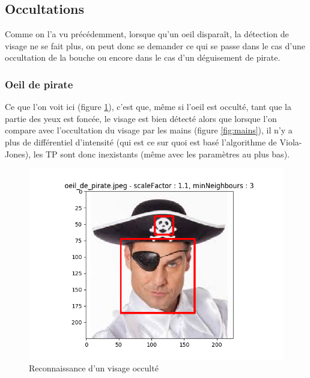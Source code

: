 \documentclass[a4paper,11pt]{article}
\begin{document}
    \subsection{Occultations}
	
	Comme on l'a vu précédemment, lorsque qu'un oeil disparaît, la détection de visage ne se
	fait plus, on peut donc se demander ce qui se passe dans le cas d'une occultation de la
	bouche ou encore dans le cas d'un déguisement de pirate.

	\subsubsection{Oeil de pirate}

	    Ce que l'on voit ici (figure \ref{fig:pirate}), c'est que, même si l'oeil est occulté, tant
	    que la partie des yeux est foncée, le visage est bien détecté alors que lorsque l'on
	    compare avec l'occultation du visage par les mains (figure \ref{fig:mains}), il n'y a
	    plus de différentiel d'intensité (qui est ce sur quoi est basé l'algorithme de
	    Viola-Jones), les TP sont donc inexistants (même avec les paramètres au plus bas).

	    \begin{figure}[H]
	        \begin{center}
		   \includegraphics[scale = 0.6]{images/oeil_de_pirate_1,1_3.png}
		   \caption{Reconnaissance d'un visage occulté}
		   \label{fig:pirate}
	        \end{center}
	    \end{figure}
\end{document}
